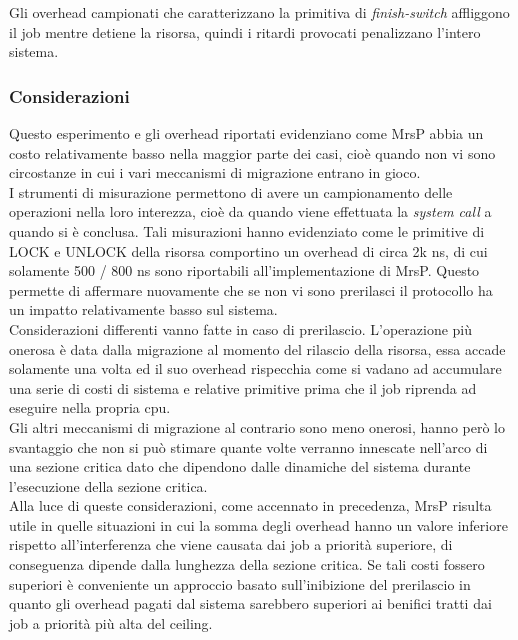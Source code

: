 \noindent Gli overhead campionati che caratterizzano la primitiva di \textit{finish-switch} affliggono il job mentre detiene la risorsa, quindi i ritardi provocati penalizzano l'intero sistema.

\subsubsection{Considerazioni}
\label{sec:overhead_cons}

\noindent Questo esperimento e gli overhead riportati evidenziano come MrsP abbia un costo relativamente basso nella maggior parte dei casi, cioè quando non vi sono circostanze in cui i vari meccanismi di migrazione entrano in gioco.\\

\noindent I strumenti di misurazione permettono di avere un campionamento delle operazioni nella loro interezza, cioè da quando viene effettuata la \textit{system call} a quando si è conclusa. Tali misurazioni hanno evidenziato come le primitive di LOCK e UNLOCK della risorsa comportino un overhead di circa 2k ns, di cui solamente 500 / 800 ns sono riportabili all'implementazione di MrsP. Questo permette di affermare nuovamente che se non vi sono prerilasci il protocollo ha un impatto relativamente basso sul sistema.\\

\noindent Considerazioni differenti vanno fatte in caso di prerilascio. L'operazione più onerosa è data dalla migrazione al momento del rilascio della risorsa, essa accade solamente una volta ed il suo overhead rispecchia come si vadano ad accumulare una serie di costi di sistema e relative primitive prima che il job riprenda ad eseguire nella propria cpu.\\

\noindent Gli altri meccanismi di migrazione al contrario sono meno onerosi, hanno però lo svantaggio che non si può stimare quante volte verranno innescate nell'arco di una sezione critica dato che dipendono dalle dinamiche del sistema durante l'esecuzione della sezione critica.\\

\noindent Alla luce di queste considerazioni, come accennato in precedenza, MrsP risulta utile in quelle situazioni in cui la somma degli overhead hanno un valore inferiore rispetto all'interferenza che viene causata dai job a priorità superiore, di conseguenza dipende dalla lunghezza della sezione critica. Se tali costi fossero superiori è conveniente un approccio basato sull'inibizione del prerilascio in quanto gli overhead pagati dal sistema sarebbero superiori ai benifici tratti dai job a priorità più alta del ceiling.

